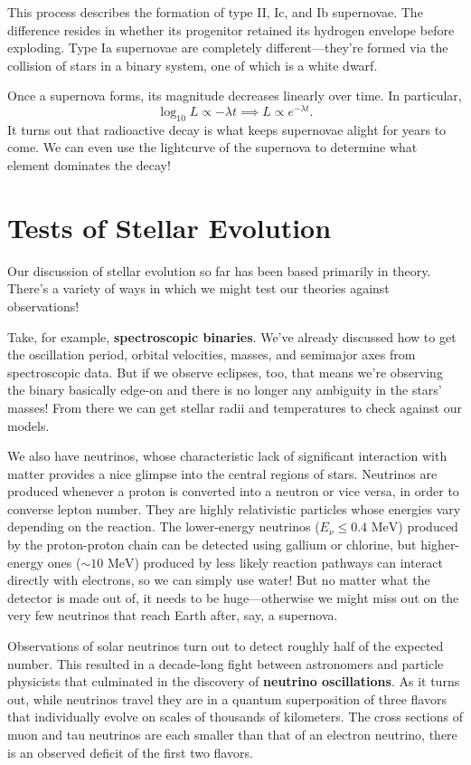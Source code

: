 \documentclass[../a062main.tex]{subfiles}
\begin{document}
This process describes the formation of type II, Ic, and Ib supernovae.
The difference resides in whether its progenitor retained its hydrogen envelope before exploding.
Type Ia supernovae are completely different---they're formed via the collision of stars in a binary system, one of which is a white dwarf.

Once a supernova forms, its magnitude decreases linearly over time.
In particular,
\[ \log_{10} L \propto -\lambda t \implies L \propto e^{-\lambda t}. \]
It turns out that radioactive decay is what keeps supernovae alight for years to come.
We can even use the lightcurve of the supernova to determine what element dominates the decay!

\section{Tests of Stellar Evolution}
Our discussion of stellar evolution so far has been based primarily in theory.
There's a variety of ways in which we might test our theories against observations!

Take, for example, \textbf{spectroscopic binaries}.
We've already discussed how to get the oscillation period, orbital velocities, masses, and semimajor axes from spectroscopic data.
But if we observe eclipses, too, that means we're observing the binary basically edge-on and there is no longer any ambiguity in the stars' masses!
From there we can get stellar radii and temperatures to check against our models.

We also have neutrinos, whose characteristic lack of significant interaction with matter provides a nice glimpse into the central regions of stars.
Neutrinos are produced whenever a proton is converted into a neutron or vice versa, in order to converse lepton number.
They are highly relativistic particles whose energies vary depending on the reaction.
The lower-energy neutrinos ($E_\nu \leq 0.4 \text{ MeV}$) produced by the proton-proton chain can be detected using gallium or chlorine, but higher-energy ones ($\sim 10 \text{ MeV}$) produced by less likely reaction pathways can interact directly with electrons, so we can simply use water!
But no matter what the detector is made out of, it needs to be huge---otherwise we might miss out on the very few neutrinos that reach Earth after, say, a supernova.

Observations of solar neutrinos turn out to detect roughly half of the expected number.
This resulted in a decade-long fight between astronomers and particle physicists that culminated in the discovery of \textbf{neutrino oscillations}.
As it turns out, while neutrinos travel they are in a quantum superposition of three flavors that individually evolve on scales of thousands of kilometers.
The cross sections of muon and tau neutrinos are each smaller than that of an electron neutrino, there is an observed deficit of the first two flavors.
\end{document}
